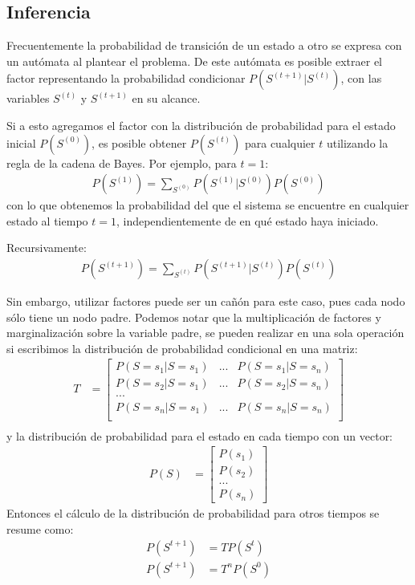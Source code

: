 \subsection{Inferencia}

Frecuentemente la probabilidad de transición de un estado a otro se expresa con un autómata al plantear el problema.  De este autómata es posible extraer el factor representando la probabilidad condicionar $P(S^{(t+1)}|S^{(t)})$, con las variables $S^{(t)}$ y  $S^{(t+1)}$ en su alcance.

Si a esto agregamos el factor con la distribución de probabilidad para el estado inicial $P(S^{(0)})$, es posible obtener $P(S^{(t)})$ para cualquier $t$ utilizando la regla de la cadena de Bayes.  Por ejemplo, para $t=1$:
\begin{align*}
 P(S^{(1)}) = \sum_{S^{(0)}} P(S^{(1)}|S^{(0)}) P(S^{(0)})
\end{align*}
con lo que obtenemos la probabilidad del que el sistema se encuentre en cualquier estado al tiempo $t=1$, independientemente de en qué estado haya iniciado.

Recursivamente:
\begin{align*}
 P(S^{(t+1)}) = \sum_{S^{(t)}} P(S^{(t+1)}|S^{(t)}) P(S^{(t)})
\end{align*}

Sin embargo, utilizar factores puede ser un cañón para este caso, pues cada nodo sólo tiene un nodo padre.  Podemos notar que la multiplicación de factores y marginalización sobre la variable padre, se pueden realizar en una sola operación si escribimos la distribución de probabilidad condicional en una matriz:
\begin{align*}
 T &= \begin{bmatrix}
        P(S=s_1|S=s_1) & ... & P(S=s_1|S=s_n) \\
        P(S=s_2|S=s_1) & ... & P(S=s_2|S=s_n) \\
        ... \\
        P(S=s_n|S=s_1) & ... & P(S=s_n|S=s_n) \\
       \end{bmatrix} \\
\end{align*}
y la distribución de probabilidad para el estado en cada tiempo con un vector:
\begin{align*}
  P(S) &= \begin{bmatrix}
	  P(s_1) \\
	  P(s_2) \\
	  ...\\
	  P(s_n)
	 \end{bmatrix}
\end{align*}
Entonces el cálculo de la distribución de probabilidad para otros tiempos se resume como:
\begin{align*}
 P(S^{t+1}) &= T P(S^{t}) \\
 P(S^{t+1}) &= T^n P(S^{0})
\end{align*}


